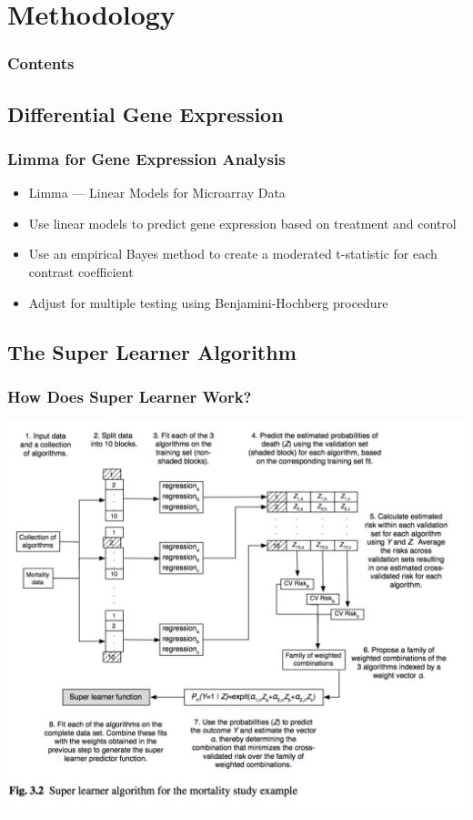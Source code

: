 \documentclass{beamer}
\begin{document}
\section{Methodology}

\begin{frame}
        \frametitle{Contents}
        \tableofcontents[currentsection,currentsubsection,hideothersubsections,sectionstyle=show/shaded]
\end{frame}

\subsection{Differential Gene Expression}

\begin{frame}[fragile]
  	\frametitle{Limma for Gene Expression Analysis}
 		\begin{itemize}
			\item Limma --- Linear Models for Microarray Data
			\item Use linear models to predict gene expression based on treatment and control
			\item Use an empirical Bayes method to create a moderated t-statistic for each contrast coefficient
			\item Adjust for multiple testing using Benjamini-Hochberg procedure
		\end{itemize}
\end{frame}

\subsection{The Super Learner Algorithm}

\begin{frame}
	\frametitle{How Does Super Learner Work?}
		\begin{center}
    			\includegraphics[scale=0.45]{../paper/figs/SuperLearn2.png}
		\end{center}
\end{frame}
\end{document}
